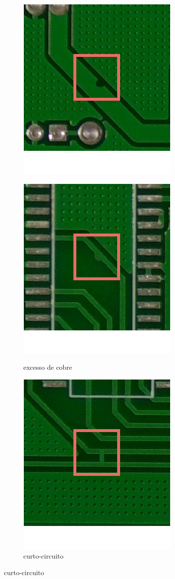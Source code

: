 \begin{figure}[H]
\begin{subfigure}[H]{0.3\textwidth}
        \includegraphics[scale=0.6]{img/img-fundamentacao-defeitos3.pdf}
        \label{fig:fund-defeitos3}
    \end{subfigure}
    \begin{subfigure}[H]{0.3\textwidth}
        \centering
        \caption{excesso de cobre}
        \includegraphics[scale=0.6]{img/img-fundamentacao-defeitos5.pdf}
        \label{fig:fund-defeitos5}
    \end{subfigure}
    \begin{subfigure}[H]{0.3\textwidth}
        \centering
        \caption{curto-circuito}
        \includegraphics[scale=0.6]{img/img-fundamentacao-defeitos4.pdf}

\end{subfigure}
\end{figure}
